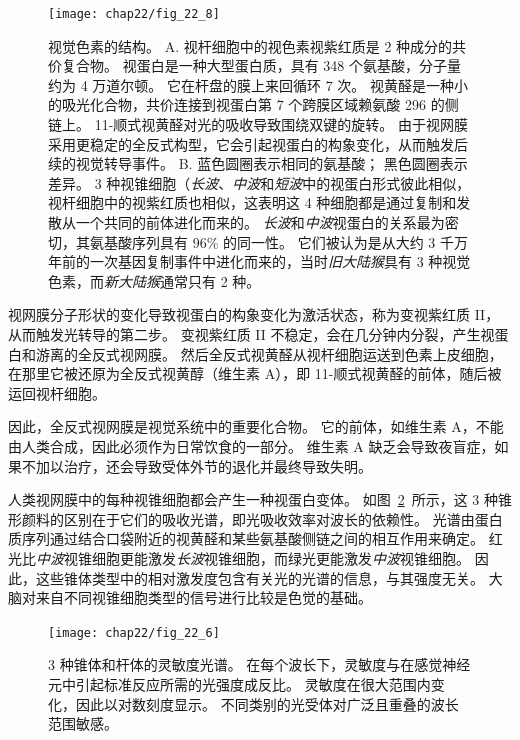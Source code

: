 \begin{figure}[htbp]
	\centering
	\texttt{[image: chap22/fig\_22\_8]}
	\caption{视觉色素的结构。
		A. 视杆细胞中的视色素视紫红质是 2 种成分的共价复合物。
		视蛋白是一种大型蛋白质，具有 348 个氨基酸，分子量约为 4 万道尔顿。
		它在杆盘的膜上来回循环 7 次。
		视黄醛是一种小的吸光化合物，共价连接到视蛋白第 7 个跨膜区域赖氨酸 296 的侧链上。
		11-顺式视黄醛对光的吸收导致围绕双键的旋转。
		由于视网膜采用更稳定的全反式构型，它会引起视蛋白的构象变化，从而触发后续的视觉转导事件\cite{nathans1984isolation}。
		B. 蓝色圆圈表示相同的氨基酸；
		黑色圆圈表示差异。
		3 种视锥细胞（\textit{长波}、\textit{中波}和\textit{短波}中的视蛋白形式彼此相似，视杆细胞中的视紫红质也相似，这表明这 4 种细胞都是通过复制和发散从一个共同的前体进化而来的。
		\textit{长波}和\textit{中波}视蛋白的关系最为密切，其氨基酸序列具有 96\% 的同一性。
		它们被认为是从大约 3 千万年前的一次基因复制事件中进化而来的，当时\textit{旧大陆猴}具有 3 种视觉色素，而\textit{新大陆猴}通常只有 2 种。}
	\label{fig:22_8}
\end{figure}


视网膜分子形状的变化导致视蛋白的构象变化为激活状态，称为变视紫红质 II，从而触发光转导的第二步。
变视紫红质 II 不稳定，会在几分钟内分裂，产生视蛋白和游离的全反式视网膜。
然后全反式视黄醛从视杆细胞运送到色素上皮细胞，在那里它被还原为全反式视黄醇（维生素 A），即 11-顺式视黄醛的前体，随后被运回视杆细胞。


因此，全反式视网膜是视觉系统中的重要化合物。
它的前体，如维生素 A，不能由人类合成，因此必须作为日常饮食的一部分。
维生素 A 缺乏会导致夜盲症，如果不加以治疗，还会导致受体外节的退化并最终导致失明。


人类视网膜中的每种视锥细胞都会产生一种视蛋白变体。 
如图~\ref{fig:22_6}~所示，这 3 种锥形颜料的区别在于它们的吸收光谱，即光吸收效率对波长的依赖性。
光谱由蛋白质序列通过结合口袋附近的视黄醛和某些氨基酸侧链之间的相互作用来确定。
红光比\textit{中波}视锥细胞更能激发\textit{长波}视锥细胞，而绿光更能激发\textit{中波}视锥细胞。
因此，这些锥体类型中的相对激发度包含有关光的光谱的信息，与其强度无关。
大脑对来自不同视锥细胞类型的信号进行比较是色觉的基础。


\begin{figure}[htbp]
	\centering
	\texttt{[image: chap22/fig\_22\_6]}
	\caption{3 种锥体和杆体的灵敏度光谱。
		在每个波长下，灵敏度与在感觉神经元中引起标准反应所需的光强度成反比。 
		灵敏度在很大范围内变化，因此以对数刻度显示。 
		不同类别的光受体对广泛且重叠的波长范围敏感。}
	\label{fig:22_6}
\end{figure}


